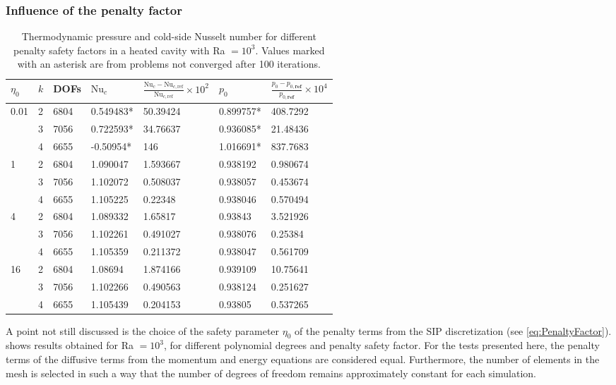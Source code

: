 \subsubsection{Influence of the penalty factor}
\begin{table}[h]
\centering
\begin{tabular}{lllllll}
	\hline \vspace{0.1cm}
		$\eta_0$                  &  $k$ & DOFs& $\text{Nu}_c$ &  $\frac{\text{Nu}_c - \text{Nu}_{c,\text{ref}}} {\text{Nu}_{c,\text{ref}}}\times 10^2 $   & $p_0$    & $\frac{p_0 - p_{0,\textbf{ref}}} {p_{0,\textbf{ref} }}\times 10^4 $ \\ \hline
\multirow{3}{*}{0.01} & 2 & 6804 & 0.549483* & 50.39424 & 0.899757* & 408.7292 \\
                      & 3 & 7056 & 0.722593* & 34.76637 & 0.936085* & 21.48436 \\
                      & 4 & 6655 & -0.50954* & 146      & 1.016691* & 837.7683 \\ \hline
\multirow{3}{*}{1}    & 2 & 6804 & 1.090047 & 1.593667 & 0.938192 & 0.980674 \\
                      & 3 & 7056 & 1.102072 & 0.508037 & 0.938057 & 0.453674 \\
                      & 4 & 6655 & 1.105225 & 0.22348  & 0.938046 & 0.570494 \\ \hline
\multirow{3}{*}{4}    & 2 & 6804 & 1.089332 & 1.65817  & 0.93843  & 3.521926 \\
                      & 3 & 7056 & 1.102261 & 0.491027 & 0.938076 & 0.25384  \\
                      & 4 & 6655 & 1.105359 & 0.211372 & 0.938047 & 0.561709 \\ \hline
\multirow{3}{*}{16}   & 2 & 6804 & 1.08694  & 1.874166 & 0.939109 & 10.75641 \\
                      & 3 & 7056 & 1.102266 & 0.490563 & 0.938124 & 0.251627 \\
                      & 4 & 6655 & 1.105439 & 0.204153 & 0.93805  & 0.537265 \\ \hline
\end{tabular}
\caption[Thermodynamic pressure and cold-side Nusselt number for different penalty safety factors in a heated cavity with Ra $=10^3$.]{Thermodynamic pressure and cold-side Nusselt number for different penalty safety factors in a heated cavity with Ra $=10^3$. Values marked with an asterisk are from problems not converged after 100 iterations.} \label{fig:EtaInfluence}
\end{table}
A point not still discussed is the choice of the safety parameter $\eta_0$ of the penalty terms from the SIP discretization (see \cref{eq:PenaltyFactor}).   shows results obtained for Ra $=10^3$, for different polynomial degrees and penalty safety factor.  For the tests presented here, the penalty terms of the diffusive terms from the momentum and energy equations are considered equal. Furthermore, the number of elements in the mesh is selected in such a way that the number of degrees of freedom remains approximately constant for each simulation. 

